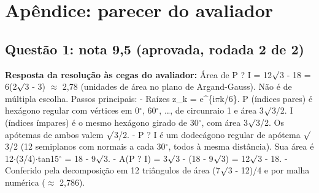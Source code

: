 \documentclass{article}%
\begin{document}
\section*{Apêndice: parecer do avaliador}%
\subsection*{Questão 1: nota 9,5 (aprovada, rodada 2 de 2)}%
\textbf{Resposta da resolução às cegas do avaliador:} Área de P ? I = 12$\surd$3 - 18 = 6(2$\surd$3 - 3) $\approx$ 2,78 (unidades de área no plano de Argand{-}Gauss). Não é de múltipla escolha.\newline%
\newline%
Passos principais:\newline%
{-} Raízes z\_k = e\^{}\{i$\pi$k/6\}. P (índices pares) é hexágono regular com vértices em 0$^\circ$, 60$^\circ$, \ldots{}, de circunraio 1 e área 3$\surd$3/2. I (índices ímpares) é o mesmo hexágono girado de 30$^\circ$, com área 3$\surd$3/2. Os apótemas de ambos valem $\surd$3/2.\newline%
{-} P ? I é um dodecágono regular de apótema $\surd$3/2 (12 semiplanos com normais a cada 30$^\circ$, todos à mesma distância). Sua área é 12$\cdot$(3/4)$\cdot$tan15$^\circ$ = 18 - 9$\surd$3.\newline%
{-} A(P ? I) = 3$\surd$3 - (18 - 9$\surd$3) = 12$\surd$3 - 18.\newline%
{-} Conferido pela decomposição em 12 triângulos de área (7$\surd$3 - 12)/4 e por malha numérica ($\approx$ 2,786).\par %
\end{document}
